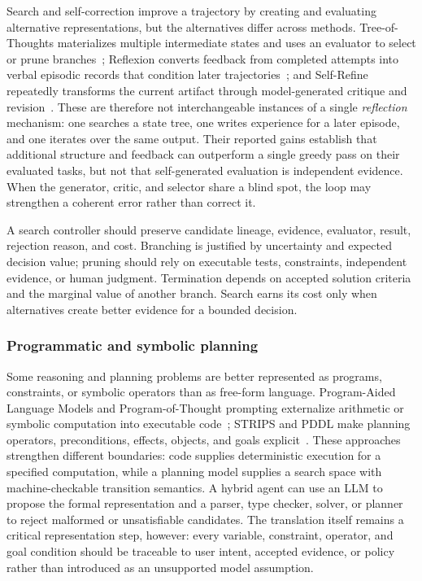 Search and self-correction improve a trajectory by creating and evaluating alternative representations, but the alternatives differ across methods. Tree-of-Thoughts materializes multiple intermediate states and uses an evaluator to select or prune branches~\cite{yao2023treeofthoughts}; Reflexion converts feedback from completed attempts into verbal episodic records that condition later trajectories~\cite{shinn2023reflexion}; and Self-Refine repeatedly transforms the current artifact through model-generated critique and revision~\cite{madaan2023selfrefine}. These are therefore not interchangeable instances of a single \emph{reflection} mechanism: one searches a state tree, one writes experience for a later episode, and one iterates over the same output. Their reported gains establish that additional structure and feedback can outperform a single greedy pass on their evaluated tasks, but not that self-generated evaluation is independent evidence. When the generator, critic, and selector share a blind spot, the loop may strengthen a coherent error rather than correct it.

A search controller should preserve candidate lineage, evidence, evaluator, result, rejection reason, and cost. Branching is justified by uncertainty and expected decision value; pruning should rely on executable tests, constraints, independent evidence, or human judgment. Termination depends on accepted solution criteria and the marginal value of another branch. Search earns its cost only when alternatives create better evidence for a bounded decision.

\subsubsection{Programmatic and symbolic planning}

Some reasoning and planning problems are better represented as programs, constraints, or symbolic operators than as free-form language. Program-Aided Language Models and Program-of-Thought prompting externalize arithmetic or symbolic computation into executable code~\cite{gao2023pal,chen2023pot}; STRIPS and PDDL make planning operators, preconditions, effects, objects, and goals explicit~\cite{fikes1971strips,mcdermott1998pddl}. These approaches strengthen different boundaries: code supplies deterministic execution for a specified computation, while a planning model supplies a search space with machine-checkable transition semantics. A hybrid agent can use an LLM to propose the formal representation and a parser, type checker, solver, or planner to reject malformed or unsatisfiable candidates. The translation itself remains a critical representation step, however: every variable, constraint, operator, and goal condition should be traceable to user intent, accepted evidence, or policy rather than introduced as an unsupported model assumption.

